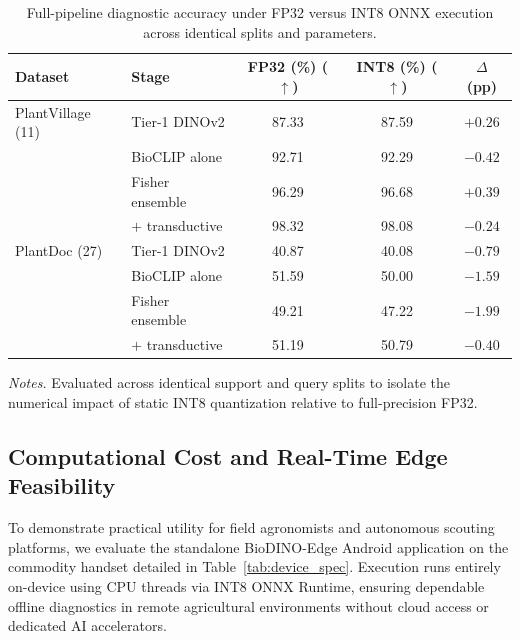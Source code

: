 \documentclass[preprint,12pt]{elsarticle}
\begin{document}
\begin{table}[htbp]
\caption{Full-pipeline diagnostic accuracy under FP32 versus INT8 ONNX execution across identical splits and parameters.}
\label{tab:quantization}
\centering

\footnotesize
\setlength{\tabcolsep}{4pt}
\begin{tabular*}{\columnwidth}{@{\extracolsep{\fill}}llccc}
\toprule
\textbf{Dataset} & \textbf{Stage} & \textbf{FP32 (\%) ($\uparrow$)} & \textbf{INT8 (\%) ($\uparrow$)} & \textbf{$\Delta$ (pp)} \\
\midrule
PlantVillage (11) & Tier-1 DINOv2 & 87.33 & 87.59 & $+0.26$ \\
 & BioCLIP alone & 92.71 & 92.29 & $-0.42$ \\
 & Fisher ensemble & 96.29 & 96.68 & $+0.39$ \\
 & $+$ transductive & 98.32 & 98.08 & $-0.24$ \\
\midrule
PlantDoc (27) & Tier-1 DINOv2 & 40.87 & 40.08 & $-0.79$ \\
 & BioCLIP alone & 51.59 & 50.00 & $-1.59$ \\
 & Fisher ensemble & 49.21 & 47.22 & $-1.99$ \\
 & $+$ transductive & 51.19 & 50.79 & $-0.40$ \\
\bottomrule
\end{tabular*}

\vspace{3pt}
\begin{minipage}{\columnwidth}
\footnotesize
\textit{Notes.} Evaluated across identical support and query splits to isolate the numerical impact of static INT8 quantization relative to full-precision FP32.
\end{minipage}
\end{table}

\subsection{Computational Cost and Real-Time Edge Feasibility}
\label{sec:edge_hardware}

To demonstrate practical utility for field agronomists and autonomous scouting platforms, we evaluate the standalone BioDINO-Edge Android application on the commodity handset detailed in Table~\ref{tab:device_spec}. Execution runs entirely on-device using CPU threads via INT8 ONNX Runtime, ensuring dependable offline diagnostics in remote agricultural environments without cloud access or dedicated AI accelerators.
\end{document}
